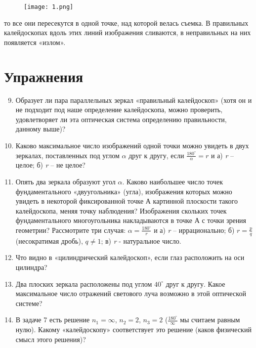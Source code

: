 \documentclass[a4paper, 11pt]{article}
\begin{document}
    \begin{minipage}[t]{0.6\textwidth}
        \begin{figure}[H]
            \setcounter{figure}{13}
            \centering
            \texttt{[image: 1.png]}
            \caption{}
        \end{figure}
        то все они пересекутся в одной точке, над которой велась съемка. В правильных калейдоскопах вдоль этих линий изображения сливаются, в неправильных на них появляется «излом».
        \titleformat{\section}{\filcenter}{}{}{}
        \section*{Упражнения}
        \begin{enumerate}

            \setcounter{enumi}{8}
            \item Образует ли пара параллельных зеркал «правильный калейдоскоп» (хотя он и не подходит под наше определение калейдоскопа, можно проверить, удовлетворяет ли эта оптическая система определению правильности, данному выше)?
            \item Каково максимальное число изображений одной точки можно увидеть в двух зеркалах, поставленных под углом $\alpha$ друг к другу, если $\frac{180^\circ}{\alpha} = r$ и а) \textit{r} -- целое; б) \textit{r} -- не целое?
            \item Опять два зеркала образуют угол $\alpha$. Каково наибольшее число точек фундаментального «двуугольника» (угла), изображения которых можно увидеть в некоторой фиксированной точке А картинной плоскости такого калейдоскопа, меняя точку наблюдения? Изображения скольких точек фундаментального многоугольника накладываются в точке А с точки зрения геометрии? Рассмотрите три случая: $\alpha = \frac{180^\circ}{r}$ и а) \textit{r} -- иррационально; б) $r= \frac{p}{q}$ (несократимая дробь), $q \neq 1$; в) \textit{r} - натуральное число.
            \item Что видно в «цилиндрический калейдоскоп», если глаз расположить на оси цилиндра?
            \item Два плоских зеркала расположены под углом $40^\circ$ друг к другу. Какое максимальное число отражений светового луча возможно в этой оптической системе?
            \item В задаче 7 есть решение $n_1 = \infty$, $n_2 = 2$, $n_3 = 2$ ($\frac{180^\circ}{\infty}$ мы считаем равным нулю). Какому «калейдоскопу» соответствует это решение (каков физический смысл этого решения)?
        \end{enumerate}
    \end{minipage}
\end{document}
